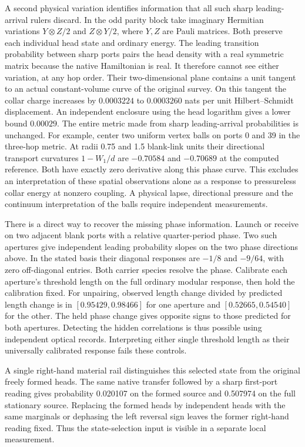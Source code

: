 \documentclass[11pt]{article}
\begin{document}
A second physical variation identifies information that all such sharp
leading-arrival rulers discard. In the odd parity block take imaginary
Hermitian variations \(Y\otimes Z/2\) and \(Z\otimes Y/2\), where
\(Y,Z\) are Pauli matrices. Both preserve each individual head state
and ordinary energy. The leading transition probability between sharp
ports pairs the head density with a real symmetric matrix because the
native Hamiltonian is real. It therefore cannot see either variation,
at any hop order. Their two-dimensional plane contains a unit tangent
to an actual constant-volume curve of the original survey. On this
tangent the collar charge increases by \(0.0003224\) to \(0.0003260\)
nats per unit Hilbert--Schmidt displacement. An independent enclosure
using the head logarithm gives a lower bound \(0.00029\). The entire
metric made from sharp leading-arrival probabilities is unchanged.
For example, center two uniform vertex balls on ports 0 and 39 in the
three-hop metric. At radii 0.75 and 1.5 blank-link units their
directional transport curvatures \(1-W_1/d\) are \(-0.70584\) and
\(-0.70689\) at the computed reference. Both have exactly zero
derivative along this phase curve. This excludes an interpretation
of these spatial observations alone as a response to pressureless
collar energy at nonzero coupling. A physical lapse, directional
pressure and the continuum interpretation of the balls require
independent measurements.

There is a direct way to recover the missing phase information.
Launch or receive on two adjacent blank ports with a relative
quarter-period phase. Two such apertures give independent leading
probability slopes on the two phase directions above. In the stated
basis their diagonal responses are \(-1/8\) and \(-9/64\), with
zero off-diagonal entries. Both carrier species resolve the phase.
Calibrate each aperture's threshold length on the full ordinary
modular response, then hold the calibration fixed. For unpairing,
observed length change divided by predicted length change is in
\([0.95429,0.98466]\) for one aperture and \([0.52665,0.54540]\)
for the other. The held phase change gives opposite signs to those
predicted for both apertures. Detecting the hidden correlations is
thus possible using independent optical records. Interpreting either
single threshold length as their universally calibrated response
fails these controls.

A single right-hand material rail distinguishes this selected state
from the original freely formed heads. The same native transfer
followed by a sharp first-port reading gives probability 0.020107
on the formed source and 0.507974 on the full stationary source.
Replacing the formed heads by independent heads with the same
marginals or dephasing the left reversal sign leaves the former
right-hand reading fixed. Thus the state-selection input is visible
in a separate local measurement.
\end{document}
